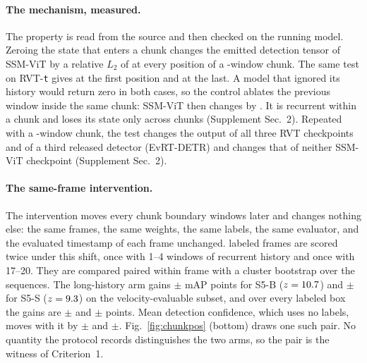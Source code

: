 \documentclass[10pt,twocolumn,letterpaper]{article}
\begin{document}
\paragraph{The mechanism, measured.}
The property is read from the source and then checked on the running model. Zeroing the state that enters a chunk changes the emitted detection tensor of SSM-ViT by a relative $L_2$ of \ssmStateEffect{} at every position of a \ssmChunkMeas-window chunk. The same test on RVT-\texttt{t} gives \rvtStateEffectOne{} at the first position and \rvtStateEffect{} at the last. A model that ignored its history would return zero in both cases, so the control ablates the previous window inside the same chunk: SSM-ViT then changes by \ssmInchunkOne{}. It is recurrent within a chunk and loses its state only across chunks (Supplement Sec.~2). Repeated with a \raChunk-window chunk, the test changes the output of all three RVT checkpoints and of a third released detector (EvRT-DETR) and changes that of neither SSM-ViT checkpoint (Supplement Sec.~2).

\paragraph{The same-frame intervention.}
The intervention moves every chunk boundary \ssmPairedShift{} windows later and changes nothing
else: the same frames, the same weights, the same labels, the same evaluator, and the evaluated
timestamp of each frame unchanged. \ssmPairedN{} labeled frames are scored twice under this
shift, once with 1--4 windows of recurrent history and once with 17--20.
They are compared paired within frame with a cluster bootstrap over the \outSeqsScanned{}
sequences. The long-history arm gains
\ssmPairedMapVelBase$\pm$\ssmPairedMapVelBaseSE{} mAP points for S5-B ($z=10.7$) and
\ssmPairedMapVelSmall$\pm$\ssmPairedMapVelSmallSE{} for S5-S ($z=9.3$) on the velocity-evaluable subset,
and over every labeled box the gains are
\ssmPairedMapAllBase$\pm$\ssmPairedMapAllBaseSE{} and \ssmPairedMapAllSmall$\pm$\ssmPairedMapAllSmallSE{} points. Mean detection confidence, which uses
no labels, moves with it by \ssmPairedConfBase$\pm$\ssmPairedConfBaseSE{} and
\ssmPairedConfSmall$\pm$\ssmPairedConfSmallSE{}. Fig.~\ref{fig:chunkpos} (bottom) draws one such
pair. No quantity the protocol records distinguishes the two arms, so the pair is the witness of Criterion~1.
\end{document}

